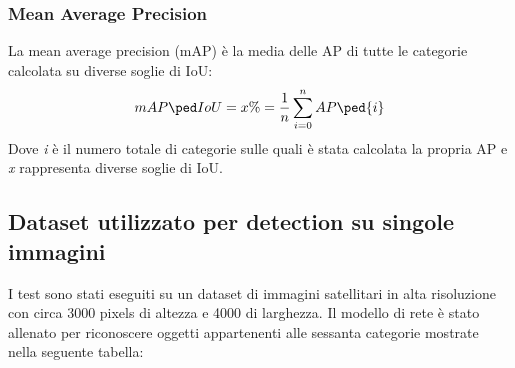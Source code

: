 \subsubsection{Mean Average Precision}
La mean average precision (mAP) è la media delle AP di tutte le categorie calcolata su diverse soglie di IoU:
\[
    mAP\ped{IoU=x\%} = \frac{1}{n}\sum_{i=0}^{n}AP\ped{i}
\]
Dove \textit{i} è il numero totale di categorie sulle quali è stata calcolata la propria AP e \textit{x} rappresenta diverse soglie di IoU.

\subsection{Dataset utilizzato per detection su singole immagini}
I test sono stati eseguiti su un dataset di immagini satellitari in alta risoluzione con circa 3000 pixels di altezza e 4000 di larghezza. Il modello di rete è stato allenato per riconoscere oggetti appartenenti alle sessanta categorie mostrate nella seguente tabella:

